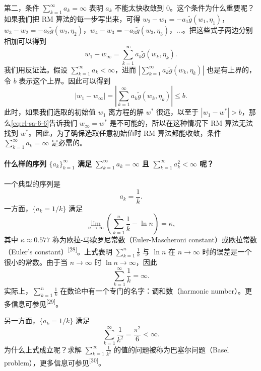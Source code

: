 第二，条件 $\sum_{k=1}^{\infty} a_k = \infty$ 表明 $a_k$ 不能太快收敛到 0。这个条件为什么重要呢？如果我们把 RM 算法的每一步写出来，可得 $w_2 - w_1 = -a_1 \tilde{g}(w_1, \eta_1)$，$w_3 - w_2 = -a_2 \tilde{g}(w_2, \eta_2)$，$w_4 - w_3 = -a_3 \tilde{g}(w_3, \eta_3)$，$\ldots$。把这些式子两边分别相加可以得到
\begin{equation}
w_1 - w_\infty = \sum_{k=1}^{\infty} a_k \tilde{g}(w_k, \eta_k).
\end{equation}
我们用反证法。假设 $\sum_{k=1}^{\infty} a_k < \infty$，进而 $\left| \sum_{k=1}^{\infty} a_k \tilde{g}(w_k, \eta_k) \right|$ 也是有上界的，令 $b$ 表示这个上界。因此可以得到
\begin{equation}
\left| w_1 - w_\infty \right| = \left| \sum_{k=1}^{\infty} a_k \tilde{g}(w_k, \eta_k) \right| \leqslant b.
\label{eq:rl-sa-6-6}
\end{equation}
此时，如果我们选取的初始值 $w_1$ 离方程的解 $w^*$ 很远，以至于 $|w_1 - w^*| > b$，那么\eqref{eq:rl-sa-6-6}告诉我们 $w_\infty = w^*$ 是不可能的，所以在这种情况下 RM 算法无法找到 $w^*$。因此，为了确保选取任意初始值时 RM 算法都能收敛，条件 $\sum_{k=1}^{\infty} a_k = \infty$ 是必需的。

\paragraph{什么样的序列 $\{a_k\}_{k=1}^{\infty}$ 满足 $\sum_{k=1}^{\infty} a_k = \infty$ 且 $\sum_{k=1}^{\infty} a_k^2 < \infty$ 呢？}
一个典型的序列是
\begin{equation}
a_k = \frac{1}{k}.
\end{equation}
一方面，$\{a_k = 1/k\}$ 满足
\begin{equation}
\lim_{n \to \infty} \left( \sum_{k=1}^{n} \frac{1}{k} - \ln n \right) = \kappa,
\end{equation}
其中 $\kappa \approx 0.577$ 称为欧拉-马歇罗尼常数（Euler-Mascheroni constant）或欧拉常数（Euler's constant）\textsuperscript{[28]}。上式表明 $\sum_{k=1}^{n} \frac{1}{k}$ 与 $\ln n$ 在 $n \to \infty$ 时的误差是一个很小的常数。由于当 $n \to \infty$ 时 $\ln n \to \infty$，因此
\begin{equation}
\sum_{k=1}^{\infty} \frac{1}{k} = \infty.
\end{equation}
实际上，$\sum_{k=1}^{n} \frac{1}{k}$ 在数论中有一个专门的名字：调和数（harmonic number）。更多信息可参见\textsuperscript{[29]}。

另一方面，$\{a_k = 1/k\}$ 满足
\begin{equation}
\sum_{k=1}^{\infty} \frac{1}{k^2} = \frac{\pi^2}{6} < \infty.
\end{equation}
为什么上式成立呢？求解 $\sum_{k=1}^{\infty} \frac{1}{k^2}$ 的值的问题被称为巴塞尔问题（Basel problem），更多信息可参见\textsuperscript{[30]}。

